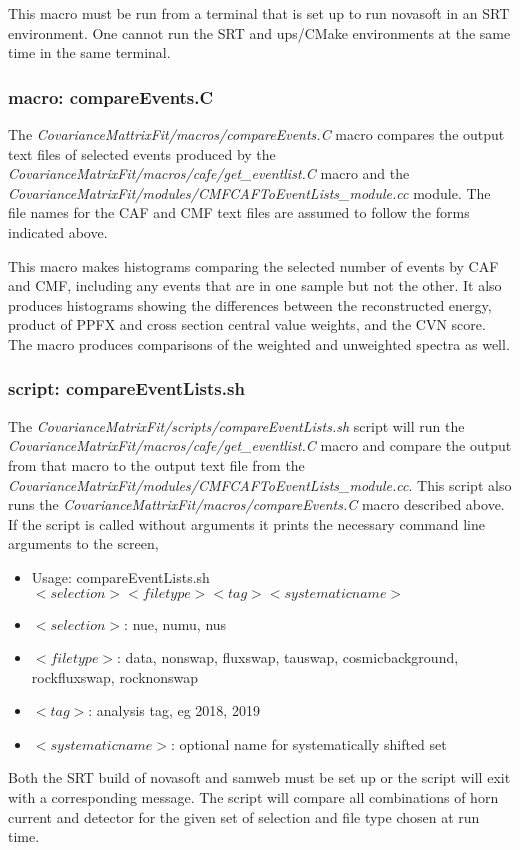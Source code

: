 This macro must be run from a terminal that is set up to run novasoft in an SRT environment.  One cannot run the SRT and ups/CMake environments at the same time in the same terminal.

\subsubsection{macro: compareEvents.C}

The {\it CovarianceMattrixFit/macros/compareEvents.C} macro compares the output text files of selected events produced by the {\it CovarianceMatrixFit/macros/cafe/get\_eventlist.C} macro and the {\it CovarianceMatrixFit/modules/CMFCAFToEventLists\_module.cc} module.  The file names for the CAF and CMF text files are assumed to follow the forms indicated above.

This macro makes histograms comparing the selected number of events by CAF and CMF, including any events that are in one sample but not the other.  It also produces histograms showing the differences between the reconstructed energy, product of PPFX and cross section central value weights, and the CVN score.  The macro produces comparisons of the weighted and unweighted spectra as well.

\subsubsection{script: compareEventLists.sh}

The {\it CovarianceMatrixFit/scripts/compareEventLists.sh} script will run the {\it CovarianceMatrixFit/macros/cafe/get\_eventlist.C} macro and compare the output from that macro to the output text file from the {\it CovarianceMatrixFit/modules/CMFCAFToEventLists\_module.cc}.  This script also runs the {\it CovarianceMattrixFit/macros/compareEvents.C} macro described above. If the script is called without arguments it prints the necessary command line arguments to the screen,
\begin{itemize}
  \item Usage: compareEventLists.sh $<selection> <filetype> <tag> <systematic name>$
  \item $<selection>$: nue, numu, nus
  \item $<filetype>$: data, nonswap, fluxswap, tauswap, cosmicbackground, rockfluxswap, rocknonswap
  \item $<tag>$: analysis tag, eg 2018, 2019
  \item $<systematic name>$: optional name for systematically shifted set
\end{itemize}
Both the SRT build of novasoft and samweb must be set up or the script will exit with a corresponding message. The script will compare all combinations of horn current and detector for the given set of selection and file  type chosen at run time.

